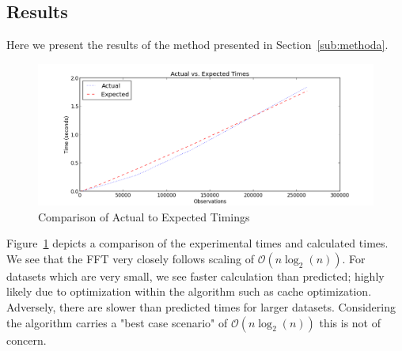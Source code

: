 \subsection{Results} %
\label{fig:resultA}
Here we present the results of the method presented in Section~\ref{sub:methoda}. 
\begin{figure}[H]
    \centering
        \includegraphics[width=6.5in]{./include/assignment1data.png}
    \caption{Comparison of Actual to Expected Timings}
    \label{fig:exactvsexpt}
\end{figure}\noindent
Figure~\ref{fig:exactvsexpt} depicts a comparison of the experimental times and calculated times. We see that the FFT very closely follows scaling of $\mathcal{O}(n \log_2(n))$. For datasets which are very small, we see faster calculation than predicted; highly likely due to optimization within the algorithm such as cache optimization. Adversely, there are slower than predicted times for larger datasets. Considering the algorithm carries a "best case scenario" of $\mathcal{O}(n \log_2(n))$ this is not of concern.

